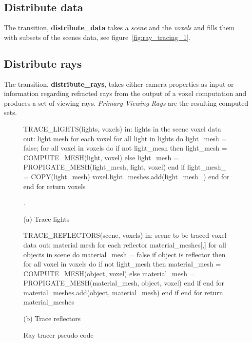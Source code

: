 \subsection{Distribute data}
The transition, \textbf{distribute\_data} takes a \emph{scene} and the 
\emph{voxels} and fills them with subsets of the scenes data, see 
figure~\ref{fig:ray_tracing_1}.

\subsection{Distribute rays}
The transition, \textbf{distribute\_rays}, takes either camera properties as 
input or information regarding refracted rays from the output of a voxel 
computation and produces a set of viewing rays.  \emph{Primary Viewing Rays} are 
the resulting computed sets.

\begin{figure}[!htb]
\begin{algorithm}
TRACE_LIGHTS(lights, voxels) 
  in:  lights in the scene
       voxel data
  out: light mesh for each voxel
  for all light in lights do
    light_mesh = false;
    for all voxel in voxels do 
      if not light_mesh then
        light_mesh = 
          COMPUTE_MESH(light, voxel)
      else
        light_mesh = 
          PROPIGATE_MESH(light_mesh, 
                       light, voxel)
      end if
      light_mesh_ = COPY(light_mesh)
      voxel.light_meshes.add(light_mesh_)
    end for
  end for
return voxels


.
\end{algorithm}

(a) Trace lights

\endminipage\hfill
{}
\begin{algorithm}
TRACE_REFLECTORS(scene, voxels) 
  in:  scene to be traced
       voxel data
  out: material mesh for each reflector
  material_meshes[,]
  for all objects in scene do
    material_mesh = false
    if object is reflector then
      for all voxel in voxels do 
        if not light_mesh then
          material_mesh = 
            COMPUTE_MESH(object, voxel)
        else
          material_mesh = 
            PROPIGATE_MESH(material_mesh, 
                         object, voxel)
        end if
      end for
      material_meshes.add(object, 
                         material_mesh)
    end if
  end for
return material_meshes
\end{algorithm}

(b) Trace reflectors

\endminipage\hfill
\caption{Ray tracer pseudo code}
\label{fig:ray_tracing_2}
\end{figure}

